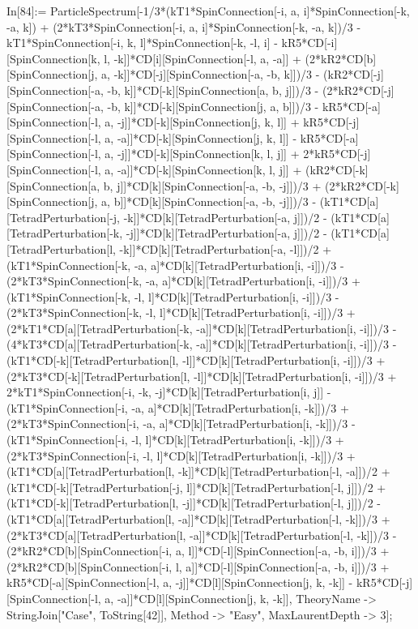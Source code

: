 In[84]:= ParticleSpectrum[-1/3*(kT1*SpinConnection[-i, a, i]*SpinConnection[-k, -a, k]) + (2*kT3*SpinConnection[-i, a, i]*SpinConnection[-k, -a, k])/3 - kT1*SpinConnection[-i, k, l]*SpinConnection[-k, -l, i] - kR5*CD[-i][SpinConnection[k, l, -k]]*CD[i][SpinConnection[-l, a, -a]] + (2*kR2*CD[b][SpinConnection[j, a, -k]]*CD[-j][SpinConnection[-a, -b, k]])/3 - (kR2*CD[-j][SpinConnection[-a, -b, k]]*CD[-k][SpinConnection[a, b, j]])/3 - (2*kR2*CD[-j][SpinConnection[-a, -b, k]]*CD[-k][SpinConnection[j, a, b]])/3 - kR5*CD[-a][SpinConnection[-l, a, -j]]*CD[-k][SpinConnection[j, k, l]] + kR5*CD[-j][SpinConnection[-l, a, -a]]*CD[-k][SpinConnection[j, k, l]] - kR5*CD[-a][SpinConnection[-l, a, -j]]*CD[-k][SpinConnection[k, l, j]] + 2*kR5*CD[-j][SpinConnection[-l, a, -a]]*CD[-k][SpinConnection[k, l, j]] + (kR2*CD[-k][SpinConnection[a, b, j]]*CD[k][SpinConnection[-a, -b, -j]])/3 + (2*kR2*CD[-k][SpinConnection[j, a, b]]*CD[k][SpinConnection[-a, -b, -j]])/3 - (kT1*CD[a][TetradPerturbation[-j, -k]]*CD[k][TetradPerturbation[-a, j]])/2 - (kT1*CD[a][TetradPerturbation[-k, -j]]*CD[k][TetradPerturbation[-a, j]])/2 - (kT1*CD[a][TetradPerturbation[l, -k]]*CD[k][TetradPerturbation[-a, -l]])/2 + (kT1*SpinConnection[-k, -a, a]*CD[k][TetradPerturbation[i, -i]])/3 - (2*kT3*SpinConnection[-k, -a, a]*CD[k][TetradPerturbation[i, -i]])/3 + (kT1*SpinConnection[-k, -l, l]*CD[k][TetradPerturbation[i, -i]])/3 - (2*kT3*SpinConnection[-k, -l, l]*CD[k][TetradPerturbation[i, -i]])/3 + (2*kT1*CD[a][TetradPerturbation[-k, -a]]*CD[k][TetradPerturbation[i, -i]])/3 - (4*kT3*CD[a][TetradPerturbation[-k, -a]]*CD[k][TetradPerturbation[i, -i]])/3 - (kT1*CD[-k][TetradPerturbation[l, -l]]*CD[k][TetradPerturbation[i, -i]])/3 + (2*kT3*CD[-k][TetradPerturbation[l, -l]]*CD[k][TetradPerturbation[i, -i]])/3 + 2*kT1*SpinConnection[-i, -k, -j]*CD[k][TetradPerturbation[i, j]] - (kT1*SpinConnection[-i, -a, a]*CD[k][TetradPerturbation[i, -k]])/3 + (2*kT3*SpinConnection[-i, -a, a]*CD[k][TetradPerturbation[i, -k]])/3 - (kT1*SpinConnection[-i, -l, l]*CD[k][TetradPerturbation[i, -k]])/3 + (2*kT3*SpinConnection[-i, -l, l]*CD[k][TetradPerturbation[i, -k]])/3 + (kT1*CD[a][TetradPerturbation[l, -k]]*CD[k][TetradPerturbation[-l, -a]])/2 + (kT1*CD[-k][TetradPerturbation[-j, l]]*CD[k][TetradPerturbation[-l, j]])/2 + (kT1*CD[-k][TetradPerturbation[l, -j]]*CD[k][TetradPerturbation[-l, j]])/2 - (kT1*CD[a][TetradPerturbation[l, -a]]*CD[k][TetradPerturbation[-l, -k]])/3 + (2*kT3*CD[a][TetradPerturbation[l, -a]]*CD[k][TetradPerturbation[-l, -k]])/3 - (2*kR2*CD[b][SpinConnection[-i, a, l]]*CD[-l][SpinConnection[-a, -b, i]])/3 + (2*kR2*CD[b][SpinConnection[-i, l, a]]*CD[-l][SpinConnection[-a, -b, i]])/3 + kR5*CD[-a][SpinConnection[-l, a, -j]]*CD[l][SpinConnection[j, k, -k]] - kR5*CD[-j][SpinConnection[-l, a, -a]]*CD[l][SpinConnection[j, k, -k]], TheoryName -> StringJoin["Case", ToString[42]], Method -> "Easy", MaxLaurentDepth -> 3]; 